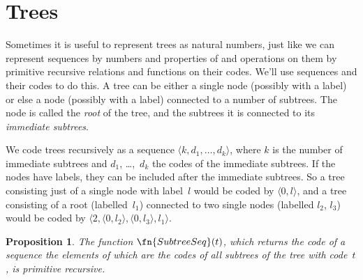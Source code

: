 \documentclass[10pt,a4paper]{article}
\theoremstyle{plain}
\newtheorem{prop}[thm]{Proposition}
\theoremstyle{definition}
\theoremstyle{remark}
\newcommand*{\olfileid}[3]{}
\newcommand*{\olsection}[1]{\section*{#1}}
\newcommand*{\ollabel}[1]{\label{#1}}
\providecommand{\tuple}[1]{\langle #1 \rangle}
\begin{document}
\olfileid{cmp}{rec}{tre}
\olsection{Trees}

Sometimes it is useful to represent trees as natural numbers, just
like we can represent sequences by numbers and properties of and
operations on them by primitive recursive relations and functions on
their codes.  We'll use sequences and their codes to do this. A tree
can be either a single node (possibly with a label) or else a node
(possibly with a label) connected to a number of subtrees. The node is
called the \emph{root} of the tree, and the subtrees it is connected
to its \emph{immediate subtrees}.

We code trees recursively as a sequence $\tuple{k, d_1, \dots, d_k}$,
where $k$ is the number of immediate subtrees and $d_1$, \dots,~$d_k$
the codes of the immediate subtrees. If the nodes have labels, they
can be included after the immediate subtrees. So a tree consisting
just of a single node with label~$l$ would be coded by $\tuple{0,l}$,
and a tree consisting of a root (labelled~$l_1$) connected to two
single nodes (labelled $l_2$, $l_3$) would be coded by $\tuple{2,
  \tuple{0, l_2}, \tuple{0, l_3}, l_1}$.

\begin{prop}
  \ollabel{prop:subtreeseq}
  The function $\fn{SubtreeSeq}(t)$, which returns the code of a
  sequence the elements of which are the codes of all subtrees of the
  tree with code~$t$, is primitive recursive.
\end{prop}
\end{document}
